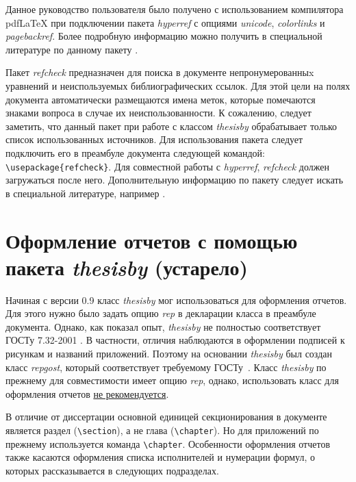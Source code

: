 Данное руководство пользователя было получено с использованием 
компилятора pdf\LaTeX{} при подключении пакета {\itshape hyperref} с опциями {\itshape unicode},  {\itshape colorlinks} и {\itshape pagebackref}. Более подробную информацию можно получить в специальной литературе по данному пакету \cite{hyperref,hyperrefop}.

Пакет {\itshape refcheck} предназначен для поиска в документе непронумерованныx уравнений и неиспользуемых библиографических ссылок. Для этой цели на полях документа автоматически размещаются имена меток, которые помечаются знаками вопроса в случае их неиспользованности. К сожалению, следует заметить, что данный пакет при работе с классом {\itshape thesisby} обрабатывает только список использованных источников. Для использования пакета следует подключить его в преамбуле документа следующей командой: \verb|\usepackage{refcheck}|. Для совместной работы с {\itshape hyperref}, {\itshape refcheck} должен загружаться после него. Дополнительную информацию по пакету следует искать в специальной литературе, например \cite{refcheck}.


\section{Оформление отчетов с помощью пакета {\itshape thesisby} (устарело)}\label{sec:rep}

Начиная с версии 0.9 класс {\itshape thesisby} мог использоваться для оформления отчетов. Для этого нужно было задать опцию {\itshape rep} в декларации класса в преамбуле документа. Однако, как показал опыт, {\itshape thesisby} не полностью соответствует ГОСТу 7.32-2001 \cite{gost7-32}. В частности, отличия наблюдаются в оформлении подписей к рисункам и названий приложений. Поэтому на основании {\itshape thesisby} был создан класс {\itshape repgost}, который соответствует требуемому ГОСТу~\cite{repgost}. Класс {\itshape thesisby} по прежнему для совместимости имеет опцию {\itshape rep}, однако, использовать класс для оформления отчетов \underline{не рекомендуется}.

В отличие от диссертации основной единицей секционирования в документе является раздел (\verb|\section|), а не глава (\verb|\chapter|). Но для приложений по прежнему используется команда \verb|\chapter|. Особенности оформления отчетов также касаются оформления списка исполнителей и нумерации формул, о которых рассказывается в следующих подразделах.

